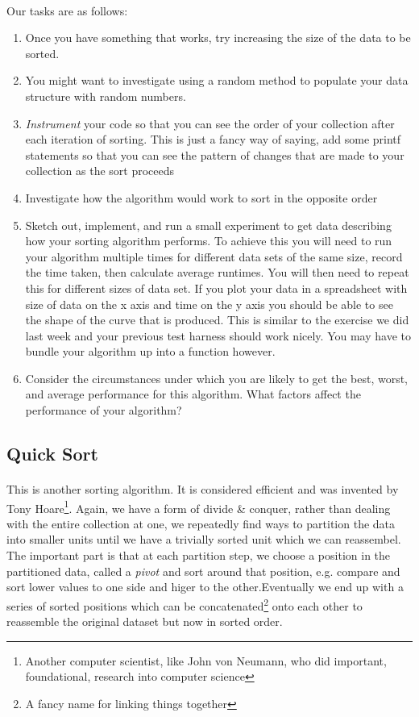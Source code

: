 \documentclass[10pt, a4paper, twosize]{article}
\begin{document}
\paragraph{} Our tasks are as follows:
\begin{enumerate}
\item Once you have something that works, try increasing the size of the data to be sorted.
\item You might want to investigate using a random method to populate your data structure with random numbers.
\item \emph{Instrument} your code so that you can see the order of your collection after each iteration of sorting. This is just a fancy way of saying, add some printf statements so that you can see the pattern of changes that are made to your collection as the sort proceeds
\item Investigate how the algorithm would work to sort in the opposite order
\item Sketch out, implement, and run a small experiment to get data describing how your sorting algorithm performs. To achieve this you will need to run your algorithm multiple times for different data sets of the same size, record the time taken, then calculate average runtimes. You will then need to repeat this for different sizes of data set. If you plot your data in a spreadsheet with size of data on the x axis and time on the y axis you should be able to see the shape of the curve that is produced. This is similar to the exercise we did last week and your previous test harness should work nicely. You may have to bundle your algorithm up into a function however.
\item Consider the circumstances under which you are likely to get the best, worst, and average performance for this algorithm. What factors affect the performance of your algorithm?
\end{enumerate}




\subsection{Quick Sort}
\paragraph{} This is another sorting algorithm. It is considered efficient and was invented by Tony Hoare\footnote{Another computer scientist, like John von Neumann, who did important, foundational, research into computer science}. Again, we have a form of divide \& conquer, rather than dealing with the entire collection at one, we repeatedly find ways to partition the data into smaller units until we have a trivially sorted unit which we can reassembel. The important part is that at each partition step, we choose a position in the partitioned data, called a \emph{pivot} and sort around that position, e.g. compare and sort lower values to one side and higer to the other.Eventually we end up with a series of sorted positions which can be concatenated\footnote{A fancy name for linking things together} onto each other to reassemble the original dataset but now in sorted order.
\end{document}
